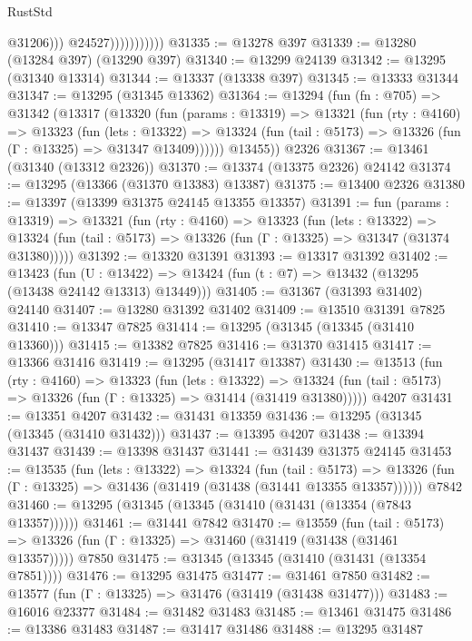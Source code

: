 \begin{lexlean}{RustStd}
\begin{coremodule}
                                @31206)))
                          @24527)))))))))))
@31335 := @13278 @397
@31339 := @13280 (@13284 @397) (@13290 @397)
@31340 := @13299 @24139
@31342 := @13295 (@31340 @13314)
@31344 := @13337 (@13338 @397)
@31345 := @13333 @31344
@31347 := @13295 (@31345 @13362)
@31364 := @13294
    (fun (fn : @705) =>
    @31342
      (@13317
        (@13320
          (fun (params : @13319) =>
          @13321
            (fun (rty : @4160) =>
            @13323
              (fun (lets : @13322) =>
              @13324 (fun (tail : @5173) => @13326 (fun (Γ : @13325) => @31347 @13409))))))
        @13455))
    @2326
@31367 := @13461 (@31340 (@13312 @2326))
@31370 := @13374 (@13375 @2326) @24142
@31374 := @13295 (@13366 (@31370 @13383) @13387)
@31375 := @13400 @2326
@31380 := @13397 (@13399 @31375 @24145 @13355 @13357)
@31391 := fun (params : @13319) =>
  @13321
    (fun (rty : @4160) =>
    @13323
      (fun (lets : @13322) =>
      @13324 (fun (tail : @5173) => @13326 (fun (Γ : @13325) => @31347 (@31374 @31380)))))
@31392 := @13320 @31391
@31393 := @13317 @31392
@31402 := @13423
    (fun (U : @13422) => @13424 (fun (t : @7) => @13432 (@13295 (@13438 @24142 @13313) @13449)))
@31405 := @31367 (@31393 @31402) @24140
@31407 := @13280 @31392 @31402
@31409 := @13510 @31391 @7825
@31410 := @13347 @7825
@31414 := @13295 (@31345 (@13345 (@31410 @13360)))
@31415 := @13382 @7825
@31416 := @31370 @31415
@31417 := @13366 @31416
@31419 := @13295 (@31417 @13387)
@31430 := @13513
    (fun (rty : @4160) =>
    @13323
      (fun (lets : @13322) =>
      @13324 (fun (tail : @5173) => @13326 (fun (Γ : @13325) => @31414 (@31419 @31380)))))
    @4207
@31431 := @13351 @4207
@31432 := @31431 @13359
@31436 := @13295 (@31345 (@13345 (@31410 @31432)))
@31437 := @13395 @4207
@31438 := @13394 @31437
@31439 := @13398 @31437
@31441 := @31439 @31375 @24145
@31453 := @13535
    (fun (lets : @13322) =>
    @13324
      (fun (tail : @5173) =>
      @13326 (fun (Γ : @13325) => @31436 (@31419 (@31438 (@31441 @13355 @13357))))))
    @7842
@31460 := @13295 (@31345 (@13345 (@31410 (@31431 (@13354 (@7843 @13357))))))
@31461 := @31441 @7842
@31470 := @13559
    (fun (tail : @5173) => @13326 (fun (Γ : @13325) => @31460 (@31419 (@31438 (@31461 @13357)))))
    @7850
@31475 := @31345 (@13345 (@31410 (@31431 (@13354 @7851))))
@31476 := @13295 @31475
@31477 := @31461 @7850
@31482 := @13577 (fun (Γ : @13325) => @31476 (@31419 (@31438 @31477)))
@31483 := @16016 @23377
@31484 := @31482 @31483
@31485 := @13461 @31475
@31486 := @13386 @31483
@31487 := @31417 @31486
@31488 := @13295 @31487

\end{coremodule}
\end{lexlean}
